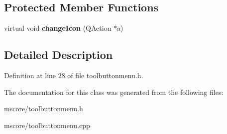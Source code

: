 \subsection*{Protected Member Functions}
\begin{DoxyCompactItemize}
\item 
\mbox{\label{class_ms_1_1_tool_button_menu_adc94aa9fcf44ba226140058ab8d84c0c}} 
virtual void {\bfseries change\+Icon} (Q\+Action $\ast$a)
\end{DoxyCompactItemize}


\subsection{Detailed Description}


Definition at line 28 of file toolbuttonmenu.\+h.



The documentation for this class was generated from the following files\+:\begin{DoxyCompactItemize}
\item 
mscore/toolbuttonmenu.\+h\item 
mscore/toolbuttonmenu.\+cpp\end{DoxyCompactItemize}
